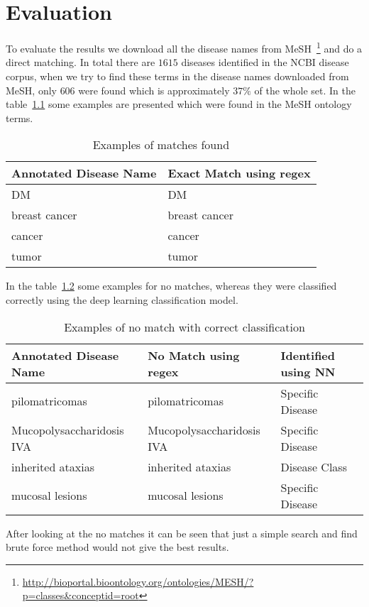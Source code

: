 \chapter{Evaluation}\label{chap:eval}

To evaluate the results we download all the disease names from MeSH~\footnote{\url{http://bioportal.bioontology.org/ontologies/MESH/?p=classes&conceptid=root}} and do a direct matching. In total there are $1615$ diseases identified in the NCBI disease corpus, when we try to find these terms in the disease names downloaded from MeSH, only $606$ were found which is approximately $37\%$ of the whole set. In the table~\ref{table: match} some examples are presented which were found in the MeSH ontology terms. 

\begin{table}[ht]
\caption{Examples of matches found}
\label{table: match}
\centering
\begin{tabular}{|l|l|}
\hline
Annotated Disease Name & Exact Match using regex \\ \hline
DM                     & DM                      \\ \hline
breast cancer          & breast cancer           \\ \hline
cancer                 & cancer                  \\ \hline
tumor                  & tumor                   \\ \hline
\end{tabular}
\end{table}

In the table~\ref{table:no_matches} some examples for no matches, whereas they were classified correctly using the deep learning classification model. 
\begin{table}[ht]
\caption{Examples of no match with correct classification}
\label{table:no_matches}
\begin{tabular}{|l|l|l|}
\hline
Annotated Disease Name    & No Match using regex      & Identified using NN \\ \hline
pilomatricomas            & pilomatricomas            & Specific Disease    \\ \hline
Mucopolysaccharidosis IVA & Mucopolysaccharidosis IVA & Specific Disease    \\ \hline
inherited ataxias         & inherited ataxias         & Disease Class       \\ \hline
mucosal lesions           & mucosal lesions           & Specific Disease    \\ \hline
\end{tabular}
\end{table}

After looking at the no matches it can be seen that just a simple search and find brute force method would not give the best results. 